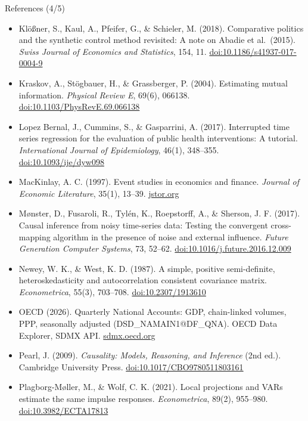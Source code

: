 \begin{frame}{References (4/5)}
\itemsize{\tiny}
\begin{itemize}
    \item Klößner, S., Kaul, A., Pfeifer, G., \& Schieler, M. (2018). Comparative politics and the synthetic control method revisited: A note on Abadie et al.\ (2015). \textit{Swiss Journal of Economics and Statistics}, 154, 11. \href{https://doi.org/10.1186/s41937-017-0004-9}{doi:10.1186/s41937-017-0004-9}
    \item Kraskov, A., Stögbauer, H., \& Grassberger, P. (2004). Estimating mutual information. \textit{Physical Review E}, 69(6), 066138. \href{https://doi.org/10.1103/PhysRevE.69.066138}{doi:10.1103/PhysRevE.69.066138}
    \item Lopez Bernal, J., Cummins, S., \& Gasparrini, A. (2017). Interrupted time series regression for the evaluation of public health interventions: A tutorial. \textit{International Journal of Epidemiology}, 46(1), 348--355. \href{https://doi.org/10.1093/ije/dyw098}{doi:10.1093/ije/dyw098}
    \item MacKinlay, A. C. (1997). Event studies in economics and finance. \textit{Journal of Economic Literature}, 35(1), 13--39. \href{https://www.jstor.org/stable/2729691}{jstor.org}
    \item Mønster, D., Fusaroli, R., Tylén, K., Roepstorff, A., \& Sherson, J. F. (2017). Causal inference from noisy time-series data: Testing the convergent cross-mapping algorithm in the presence of noise and external influence. \textit{Future Generation Computer Systems}, 73, 52--62. \href{https://doi.org/10.1016/j.future.2016.12.009}{doi:10.1016/j.future.2016.12.009}
    \item Newey, W. K., \& West, K. D. (1987). A simple, positive semi-definite, heteroskedasticity and autocorrelation consistent covariance matrix. \textit{Econometrica}, 55(3), 703--708. \href{https://doi.org/10.2307/1913610}{doi:10.2307/1913610}
    \item OECD (2026). Quarterly National Accounts: GDP, chain-linked volumes, PPP, seasonally adjusted (DSD\_NAMAIN1@DF\_QNA). OECD Data Explorer, SDMX API. \href{https://sdmx.oecd.org/public/rest/dataflow/OECD.SDD.NAD/DSD_NAMAIN1@DF_QNA/1.1}{sdmx.oecd.org}
    \item Pearl, J. (2009). \textit{Causality: Models, Reasoning, and Inference} (2nd ed.). Cambridge University Press. \href{https://doi.org/10.1017/CBO9780511803161}{doi:10.1017/CBO9780511803161}
    \item Plagborg-Møller, M., \& Wolf, C. K. (2021). Local projections and VARs estimate the same impulse responses. \textit{Econometrica}, 89(2), 955--980. \href{https://doi.org/10.3982/ECTA17813}{doi:10.3982/ECTA17813}

\end{itemize}
\end{frame}
